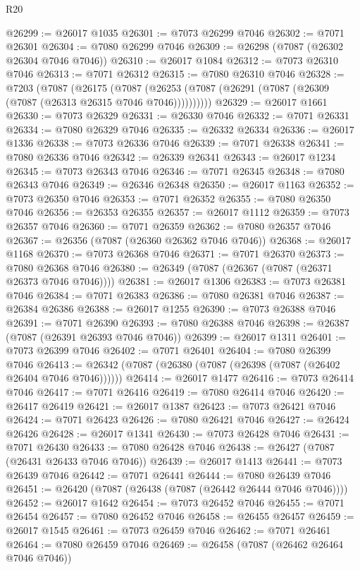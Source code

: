 \begin{lexlean}{R20}
\begin{coremodule}
{@26299 := @26017 @1035
@26301 := @7073 @26299 @7046
@26302 := @7071 @26301
@26304 := @7080 @26299 @7046
@26309 := @26298 (@7087 (@26302 @26304 @7046 @7046))
@26310 := @26017 @1084
@26312 := @7073 @26310 @7046
@26313 := @7071 @26312
@26315 := @7080 @26310 @7046
@26328 := @7203
    (@7087
      (@26175
        (@7087 (@26253 (@7087 (@26291 (@7087 (@26309 (@7087 (@26313 @26315 @7046 @7046))))))))))
@26329 := @26017 @1661
@26330 := @7073 @26329
@26331 := @26330 @7046
@26332 := @7071 @26331
@26334 := @7080 @26329 @7046
@26335 := @26332 @26334
@26336 := @26017 @1336
@26338 := @7073 @26336 @7046
@26339 := @7071 @26338
@26341 := @7080 @26336 @7046
@26342 := @26339 @26341
@26343 := @26017 @1234
@26345 := @7073 @26343 @7046
@26346 := @7071 @26345
@26348 := @7080 @26343 @7046
@26349 := @26346 @26348
@26350 := @26017 @1163
@26352 := @7073 @26350 @7046
@26353 := @7071 @26352
@26355 := @7080 @26350 @7046
@26356 := @26353 @26355
@26357 := @26017 @1112
@26359 := @7073 @26357 @7046
@26360 := @7071 @26359
@26362 := @7080 @26357 @7046
@26367 := @26356 (@7087 (@26360 @26362 @7046 @7046))
@26368 := @26017 @1168
@26370 := @7073 @26368 @7046
@26371 := @7071 @26370
@26373 := @7080 @26368 @7046
@26380 := @26349 (@7087 (@26367 (@7087 (@26371 @26373 @7046 @7046))))
@26381 := @26017 @1306
@26383 := @7073 @26381 @7046
@26384 := @7071 @26383
@26386 := @7080 @26381 @7046
@26387 := @26384 @26386
@26388 := @26017 @1255
@26390 := @7073 @26388 @7046
@26391 := @7071 @26390
@26393 := @7080 @26388 @7046
@26398 := @26387 (@7087 (@26391 @26393 @7046 @7046))
@26399 := @26017 @1311
@26401 := @7073 @26399 @7046
@26402 := @7071 @26401
@26404 := @7080 @26399 @7046
@26413 := @26342 (@7087 (@26380 (@7087 (@26398 (@7087 (@26402 @26404 @7046 @7046))))))
@26414 := @26017 @1477
@26416 := @7073 @26414 @7046
@26417 := @7071 @26416
@26419 := @7080 @26414 @7046
@26420 := @26417 @26419
@26421 := @26017 @1387
@26423 := @7073 @26421 @7046
@26424 := @7071 @26423
@26426 := @7080 @26421 @7046
@26427 := @26424 @26426
@26428 := @26017 @1341
@26430 := @7073 @26428 @7046
@26431 := @7071 @26430
@26433 := @7080 @26428 @7046
@26438 := @26427 (@7087 (@26431 @26433 @7046 @7046))
@26439 := @26017 @1413
@26441 := @7073 @26439 @7046
@26442 := @7071 @26441
@26444 := @7080 @26439 @7046
@26451 := @26420 (@7087 (@26438 (@7087 (@26442 @26444 @7046 @7046))))
@26452 := @26017 @1642
@26454 := @7073 @26452 @7046
@26455 := @7071 @26454
@26457 := @7080 @26452 @7046
@26458 := @26455 @26457
@26459 := @26017 @1545
@26461 := @7073 @26459 @7046
@26462 := @7071 @26461
@26464 := @7080 @26459 @7046
@26469 := @26458 (@7087 (@26462 @26464 @7046 @7046))
}
\end{coremodule}
\end{lexlean}
